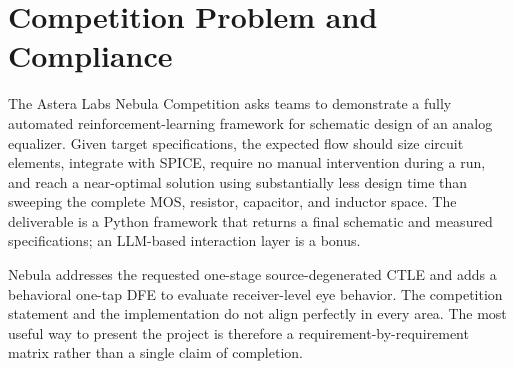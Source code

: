\chapter{Competition Problem and Compliance}

The Astera Labs Nebula Competition asks teams to demonstrate a fully automated
reinforcement-learning framework for schematic design of an analog equalizer.
Given target specifications, the expected flow should size circuit elements,
integrate with SPICE, require no manual intervention during a run, and reach a
near-optimal solution using substantially less design time than sweeping the
complete MOS, resistor, capacitor, and inductor space. The deliverable is a
Python framework that returns a final schematic and measured specifications; an
LLM-based interaction layer is a bonus.

Nebula addresses the requested one-stage source-degenerated CTLE and adds a
behavioral one-tap DFE to evaluate receiver-level eye behavior. The competition
statement and the implementation do not align perfectly in every area. The most
useful way to present the project is therefore a requirement-by-requirement
matrix rather than a single claim of completion.

